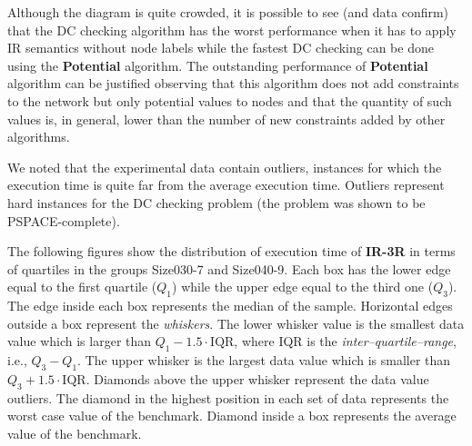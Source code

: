 \documentclass[a4paper,11pt]{article}
\begin{document}
\begin{center}
\end{center}

Although the diagram is quite crowded, it is possible to see (and data confirm) that the DC checking algorithm has the worst performance when it has to 
apply IR semantics without node labels while the fastest DC checking can be done using the \textbf{Potential} algorithm.
The outstanding performance of \textbf{Potential} algorithm can be justified observing that this algorithm does not add constraints to the network but only potential values to nodes and that the quantity of such values is, in general, lower than the number of new constraints added by other algorithms.

We noted that the experimental data contain outliers, instances for which the execution time is quite far from the average execution time.
Outliers represent hard instances for the DC checking problem (the problem was shown to be PSPACE-complete).

The following figures show the distribution of execution time of \textbf{IR-3R} in terms of quartiles in the groups Size030-7 and Size040-9. 
Each box has the lower edge equal to the first quartile ($Q_1$) while the upper edge equal to the third one ($Q_3$).
The edge inside each box represents the median of the sample.
Horizontal edges outside a box represent the \textit{whiskers}. The lower whisker value is the smallest data value which is larger than $Q_1-1.5\cdot \mathrm{IQR}$, where IQR is the \textit{inter–quartile–range}, i.e.,  $Q_3-Q_1$. The upper whisker is the largest data value which is smaller than $Q_3+1.5\cdot \mathrm{IQR}$. 
Diamonds above the upper whisker represent the data value outliers. 	The diamond in the highest position in each set of data represents the worst case value of the benchmark. Diamond inside a box represents the average value of the benchmark.
\smallskip
\end{document}
